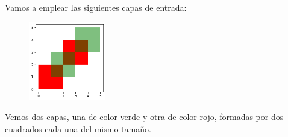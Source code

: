 Vamos a emplear las siguientes capas de entrada:
\begin{figure}[H]
    \centering
    \includegraphics[width=0.30\textwidth]{Imagenes/analisis/capas-superposicion.png}
    \label{fig:capas-superposicion}
\end{figure}
Vemos dos capas, una de color verde y otra de color rojo, formadas por dos cuadrados cada una del mismo tamaño.

